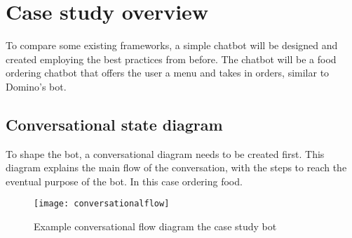\chapter{Case study overview}

To compare some existing frameworks, a simple chatbot will be designed and created employing the best practices from before. The chatbot will be a food ordering chatbot that offers the user a menu and takes in orders, similar to Domino's bot.

\section{Conversational state diagram}

To shape the bot, a conversational diagram needs to be created first. This diagram explains the main flow of the conversation, with the steps to reach the eventual purpose of the bot. In this case ordering food.

\begin{figure}[ht]
	\centering
	\texttt{[image: conversationalflow]}
	\caption{Example conversational flow diagram the case study bot~}
	\label{fig:conversationalflow}
\end{figure}
